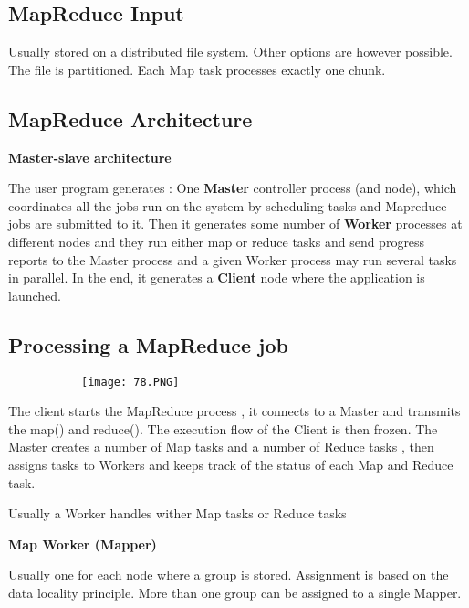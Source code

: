 \documentclass{article}
\begin{document}
\subsection{MapReduce Input}
Usually stored on a distributed file system. Other options are however possible. The file is partitioned.
Each Map task processes exactly one chunk.

\subsection{MapReduce Architecture}

\textbf{Master-slave architecture}

The user program generates : One \textbf{Master} controller process (and node), which coordinates all the jobs run on the system by scheduling tasks and Mapreduce jobs are submitted to it.
Then it generates some number of \textbf{Worker} processes at different nodes and they run either map or reduce tasks and send progress reports to the Master process and a given Worker process may run several tasks in parallel.
In the end, it generates a \textbf{Client} node where the application is launched.

\subsection{Processing a MapReduce job}

\begin{figure}[ht!]
  \centering
  \begin{subfigure}[b]{0.5\linewidth}
    \texttt{[image: 78.PNG]}
  \end{subfigure}
\end{figure}

The client starts the MapReduce process , it connects to a Master and transmits the map() and reduce().
The execution flow of the Client is then frozen.
The Master creates a number of Map tasks and a number of Reduce tasks , then assigns tasks to Workers and keeps track of the status of each Map and Reduce task.

Usually a Worker handles wither Map tasks or Reduce tasks 


\vspace{3mm}
\textbf{Map Worker (Mapper)}

Usually one for each node where a group is stored. Assignment is based on the data locality principle. More than one group can be assigned to a single Mapper.
\end{document}
